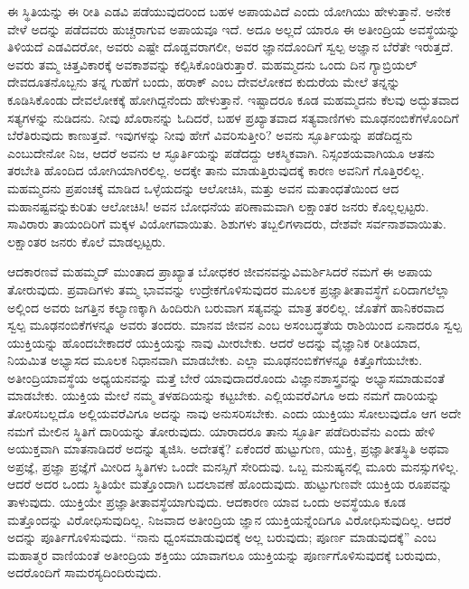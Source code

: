 ಈ ಸ್ಥಿತಿಯನ್ನು ಈ ರೀತಿ ಎಡವಿ ಪಡೆಯುವುದರಿಂದ ಬಹಳ ಅಪಾಯವಿದೆ ಎಂದು ಯೋಗಿಯು ಹೇಳುತ್ತಾನೆ. ಅನೇಕ ವೇಳೆ ಅದನ್ನು ಪಡೆದವರು ಹುಚ್ಚರಾಗುವ ಅಪಾಯವೂ ಇದೆ. ಅದೂ ಅಲ್ಲದೆ ಯಾರೂ ಈ ಅತೀಂದ್ರಿಯ ಅವಸ್ಥೆಯನ್ನು ತಿಳಿಯದೆ ಎಡವಿದರೋ, ಅವರು ಎಷ್ಟೇ ದೊಡ್ಡವರಾಗಲೀ, ಅವರ ಜ್ಞಾನದೊಂದಿಗೆ ಸ್ವಲ್ಪ ಅಜ್ಞಾನ ಬೆರೆತೇ ಇರುತ್ತದೆ. ಅವರು ತಮ್ಮ ಚಿತ್ತವಿಕಾರಕ್ಕೆ ಅವಕಾಶವನ್ನು ಕಲ್ಪಿಸಿಕೊಂಡಿರುತ್ತಾರೆ. ಮಹಮ್ಮದನು ಒಂದು ದಿನ ಗ್ಯಾಬ್ರಿಯಲ್​ ದೇವದೂತನೊಬ್ಬನು ತನ್ನ ಗುಹೆಗೆ ಬಂದು, ಹರಾಕ್​ ಎಂಬ ದೇವಲೋಕದ ಕುದುರೆಯ ಮೇಲೆ ತನ್ನನ್ನು ಕೂಡಿಸಿಕೊಂಡು ದೇವಲೋಕಕ್ಕೆ ಹೋಗಿದ್ದನೆಂದು ಹೇಳುತ್ತಾನೆ. ಇಷ್ಟಾದರೂ ಕೂಡ ಮಹಮ್ಮದನು ಕೆಲವು ಅದ್ಭುತವಾದ ಸತ್ಯಗಳನ್ನು ನುಡಿದನು. ನೀವು ಖೊರಾನನ್ನು ಓದಿದರೆ, ಬಹಳ ಪ್ರಖ್ಯಾತವಾದ ಸತ್ಯವಾಣಿಗಳು ಮೂಢನಂಬಿಕೆಗಳೊಂದಿಗೆ ಬೆರೆತಿರುವುದು ಕಾಣುತ್ತವೆ. ಇವುಗಳನ್ನು ನೀವು ಹೇಗೆ ವಿವರಿಸುತ್ತೀರಿ? ಅವನು ಸ್ಫೂರ್ತಿಯನ್ನು ಪಡೆದಿದ್ದನು ಎಂಬುದೇನೋ ನಿಜ, ಆದರೆ ಅವನು ಆ ಸ್ಫೂರ್ತಿಯನ್ನು ಪಡೆದದ್ದು ಆಕಸ್ಮಿಕವಾಗಿ. ನಿಸ್ಸಂಶಯವಾಗಿಯೂ ಆತನು ತರಬೇತಿ ಹೊಂದಿದ ಯೋಗಿಯಾಗಿರಲಿಲ್ಲ. ಅದಕ್ಕೇ ತಾನು ಮಾಡುತ್ತಿರುವುದಕ್ಕೆ ಕಾರಣ ಅವನಿಗೆ ಗೊತ್ತಿರಲಿಲ್ಲ. ಮಹಮ್ಮದನು ಪ್ರಪಂಚಕ್ಕೆ ಮಾಡಿದ ಒಳ್ಳೆಯದನ್ನು ಆಲೋಚಿಸಿ, ಮತ್ತು ಅವನ ಮತಾಂಧತೆಯಿಂದ ಆದ ಮಹಾನಷ್ಟವನ್ನುಕುರಿತು ಆಲೋಚಿಸಿ! ಅವನ ಬೋಧನೆಯ ಪರಿಣಾಮವಾಗಿ ಲಕ್ಷಾಂತರ ಜನರು ಕೊಲ್ಲಲ್ಪಟ್ಟರು. ಸಾವಿರಾರು ತಾಯಂದಿರಿಗೆ ಮಕ್ಕಳ ವಿಯೋಗವಾಯಿತು. ಶಿಶುಗಳು ತಬ್ಬಲಿಗಳಾದರು, ದೇಶವೇ ಸರ್ವನಾಶವಾಯಿತು. ಲಕ್ಷಾಂತರ ಜನರು ಕೊಲೆ ಮಾಡಲ್ಪಟ್ಟರು. 

ಆದಕಾರಣವೆ ಮಹಮ್ಮದ್​ ಮುಂತಾದ ಪ್ರಾಖ್ಯಾತ ಬೋಧಕರ ಜೀವನವನ್ನು\break ವಿಮರ್ಶಿಸಿದರೆ ನಮಗೆ ಈ ಅಪಾಯ ತೋರುವುದು. ಪ್ರವಾದಿಗಳು ತಮ್ಮ ಭಾವವನ್ನು ಉದ್ರೇಕಗೊಳಿಸುವುದರ ಮೂಲಕ ಪ್ರಜ್ಞಾತೀತಾವಸ್ಥೆಗೆ ಏರಿದಾಗಲೆಲ್ಲಾ ಅಲ್ಲಿಂದ ಅವರು ಜಗತ್ತಿನ ಕಲ್ಯಾಣಕ್ಕಾಗಿ ಹಿಂದಿರುಗಿ ಬರುವಾಗ ಸತ್ಯವನ್ನು ಮಾತ್ರ ತರಲಿಲ್ಲ. ಜೊತೆಗೆ ಹಾನಿಕರವಾದ ಸ್ವಲ್ಪ ಮೂಢನಂಬಿಕೆಗಳನ್ನೂ ಅವರು ತಂದರು. ಮಾನವ ಜೀವನ ಎಂಬ ಅಸಂಬದ್ಧತೆಯ ರಾಶಿಯಿಂದ ಏನಾದರೂ ಸ್ವಲ್ಪ ಯುಕ್ತಿಯನ್ನು ಹೊಂದಬೇಕಾದರೆ ಯುಕ್ತಿಯನ್ನು ನಾವು ಮೀರಬೇಕು. ಆದರೆ ಅದನ್ನು ವೈಜ್ಞಾನಿಕ ರೀತಿಯಾದ, ನಿಯಮಿತ ಅಭ್ಯಾಸದ ಮೂಲಕ ನಿಧಾನವಾಗಿ ಮಾಡಬೇಕು. ಎಲ್ಲಾ ಮೂಢನಂಬಿಕೆಗಳನ್ನೂ ಕಿತ್ತೊಗೆಯಬೇಕು. ಅತೀಂದ್ರಿಯಾವಸ್ಥೆಯ ಅಧ್ಯಯನವನ್ನು ಮತ್ತೆ ಬೇರೆ ಯಾವುದಾದರೊಂದು ವಿಜ್ಞಾನಶಾಸ್ತ್ರವನ್ನು ಅಭ್ಯಾಸಮಾಡುವಂತೆ ಮಾಡಬೇಕು. ಯುಕ್ತಿಯ ಮೇಲೆ ನಮ್ಮ ತಳಹದಿಯನ್ನು ಕಟ್ಟಬೇಕು. ಎಲ್ಲಿಯವರೆವಿಗೂ ಅದು ನಮಗೆ ದಾರಿಯನ್ನು ತೋರಿಸಬಲ್ಲದೊ ಅಲ್ಲಿಯವರೆವಿಗೂ ಅದನ್ನು ನಾವು ಅನುಸರಿಸಬೇಕು. ಎಂದು ಯುಕ್ತಿಯು ಸೋಲುವುದೊ ಆಗ ಅದೇ ನಮಗೆ ಮೇಲಿನ ಸ್ಥಿತಿಗೆ ದಾರಿಯನ್ನು ತೋರುವುದು. ಯಾರಾದರೂ ತಾನು ಸ್ಫೂರ್ತಿ ಪಡೆದಿರುವೆನು ಎಂದು ಹೇಳಿ ಅಯುಕ್ತವಾಗಿ ಮಾತನಾಡಿದರೆ ಅದನ್ನು ತ್ಯಜಿಸಿ. ಅದೇತಕ್ಕೆ? ಏಕೆಂದರೆ ಹುಟ್ಟುಗುಣ, ಯುಕ್ತಿ, ಪ್ರಜ್ಞಾತೀತಸ್ಥಿತಿ ಅಥವಾ ಅಪ್ರಜ್ಞೆ, ಪ್ರಜ್ಞಾ ಪ್ರಜ್ಞೆಗೆ ಮೀರಿದ ಸ್ಥಿತಿಗಳು ಒಂದೇ ಮನಸ್ಸಿಗೆ ಸೇರಿದುವು. ಒಬ್ಬ ಮನುಷ್ಯನಲ್ಲಿ ಮೂರು ಮನಸ್ಸುಗಳಿಲ್ಲ. ಆದರೆ ಅದರ ಒಂದು ಸ್ಥಿತಿಯೇ ಮತ್ತೊಂದಾಗಿ ಬದಲಾವಣೆ ಹೊಂದುವುದು. ಹುಟ್ಟುಗುಣವೇ ಯುಕ್ತಿಯ ರೂಪವನ್ನು ತಾಳುವುದು. ಯುಕ್ತಿಯೇ ಪ್ರಜ್ಞಾತೀತಾವಸ್ಥೆಯಾಗುವುದು. ಆದಕಾರಣ ಯಾವ ಒಂದು ಅವಸ್ಥೆಯೂ ಕೂಡ ಮತ್ತೊಂದನ್ನು ವಿರೋಧಿಸುವುದಿಲ್ಲ. ನಿಜವಾದ ಅತೀಂದ್ರಿಯ ಜ್ಞಾನ ಯುಕ್ತಿಯನ್ನೆಂದಿಗೂ ವಿರೋಧಿಸುವುದಿಲ್ಲ. ಆದರೆ ಅದನ್ನು ಪೂರ್ತಿಗೊಳಿಸುವುದು. “ನಾನು ಧ್ವಂಸಮಾಡುವುದಕ್ಕೆ ಅಲ್ಲ ಬರುವುದು; ಪೂರ್ಣ ಮಾಡುವುದಕ್ಕೆ” ಎಂಬ ಮಹಾತ್ಮರ ವಾಣಿಯಂತೆ ಅತೀಂದ್ರಿಯ ಶಕ್ತಿಯು ಯಾವಾಗಲೂ ಯುಕ್ತಿಯನ್ನು ಪೂರ್ಣಗೊಳಿಸುವುದಕ್ಕೆ ಬರುವುದು, ಅದರೊಂದಿಗೆ ಸಾಮರಸ್ಯದಿಂದಿರುವುದು. 

